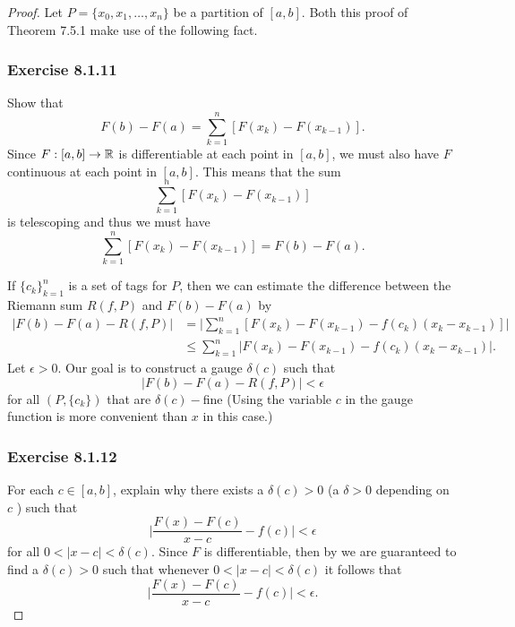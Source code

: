 \begin{proof}
    Let \( P = \{ x_{0}, x_{1}, \dots, x_{n} \}  \) be a partition of \( [a,b]  \). Both this proof of Theorem 7.5.1 make use of the following fact.



\subsubsection{Exercise 8.1.11} Show that 
    \[  F(b) - F(a) = \sum_{ k=1 }^{ n } [F(x_{k} ) - F(x_{k-1})].\]
    Since \( F: [a,b] \to \mathbb{R}  \) is differentiable at each point in \( [a,b]  \), we must also have \( F  \) continuous at each point in \( [a,b]  \). This means that the sum 
    \[  \sum_{ k=1 }^{ n }[F(x_{k }) - F(x_{k-1})] \] is telescoping and thus we must have 
    \[  \sum_{ k=1 }^{ n }[F(x_{k }) - F(x_{k-1})] = F(b) - F(a). \] 


    If \( \{ c_{k }  \}_{k=1}^{n} \) is a set of tags for \( P  \), then we can estimate the difference between the Riemann sum \( R(f,P)  \) and \( F(b) - F(a)  \) by
\begin{align*}
    | F(b) - F(a) - R(f,P)  | &= \Big| \sum_{ k=1 }^{ n } [F(x_{k}) - F(x_{k-1}) - f(c_{k}) (x_{k } - x_{k-1})] \Big|  \\
                              &\leq \sum_{ k=1 }^{ n } | F(x_{k}) - F(x_{k-1}) - f(c_{k })(x_{k } - x_{k-1}) |.
\end{align*}
Let \( \epsilon > 0  \). Our goal is to construct a gauge \( \delta(c)  \) such that 
\[  | F(b) - F(a) - R(f,P)  | < \epsilon \]
for all \( (P, \{ c_{k } \} ) \) that are \( \delta(c)- \)fine (Using the variable \( c  \) in the gauge function is more convenient than \( x  \) in this case.)


\subsubsection{Exercise 8.1.12} For each \( c \in [a,b]  \), explain why there exists a \( \delta(c) > 0  \) (a \( \delta > 0  \) depending on \( c   \) ) such that 
\[  \Big| \frac{ F(x) - F(c)  }{ x -c  }  - f(c)  \Big|  < \epsilon \]
for all \( 0 < | x -c  | < \delta(c)  \).
Since \( F  \) is differentiable, then by we are guaranteed to find a \( \delta(c) > 0  \) such that whenever \( 0 < | x - c  |  < \delta(c)  \) it follows that 
\[  \Big| \frac{ F(x) - F(c)  }{ x -c  }  - f(c)  \Big| < \epsilon. \]






\end{proof}
